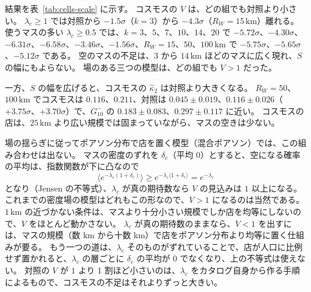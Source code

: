 \documentclass[a4paper,11pt]{ltjsarticle}
\begin{document}
結果を表~\ref{tab:cells-scale} に示す。
コスモスの $V$ は、どの組でも対照より小さい。
$\lambda_c \ge 1$ では対照から $-1.5\sigma$（$k = 3$）から $-4.3\sigma$（$R_W = 15\,\mathrm{km}$）離れる。
使うマスの多い $\lambda_c \ge 0.5$ では、$k = 3$、$5$、$7$、$10$、$14$、$20$ で $-5.72\sigma$、$-4.30\sigma$、$-6.31\sigma$、$-6.58\sigma$、$-3.46\sigma$、$-1.56\sigma$、$R_W = 15$、$50$、$100\,\mathrm{km}$ で $-5.75\sigma$、$-5.65\sigma$、$-5.12\sigma$ である。
空のマスの不足は、$3$ から $14\,\mathrm{km}$ ほどのマスに広く現れ、$S$ の幅にもよらない。
場のある三つの模型は、どの組でも $V > 1$ だった。

一方、$S$ の幅を広げると、コスモスの $\hat\kappa_2$ は対照より大きくなる。
$R_W = 50$、$100\,\mathrm{km}$ でコスモスは $0.116$、$0.211$、対照は $0.045 \pm 0.019$、$0.116 \pm 0.026$（$+3.75\sigma$、$+3.70\sigma$）で、$G_{10}^{-}$ の $0.183 \pm 0.083$、$0.297 \pm 0.117$ に近い。
コスモスの店は、$25\,\mathrm{km}$ より広い規模では固まっていながら、マスの空きは少ない。

場の揺らぎに従ってポアソン分布で店を置く模型（混合ポアソン）では、この組み合わせは出ない。
マスの密度のずれを $\delta_c$（平均 $0$）とすると、空になる確率の平均は、指数関数が下に凸なので
\begin{equation}
  \langle e^{-\lambda_c (1 + \delta_c)} \rangle \ge e^{-\lambda_c \langle 1 + \delta_c \rangle} = e^{-\lambda_c}
\end{equation}
となり（Jensen の不等式）、$\lambda_c$ が真の期待数なら $V$ の見込みは $1$ 以上になる。
これまでの密度場の模型はどれもこの形なので、$V > 1$ になるのは当然である。
$1\,\mathrm{km}$ の近づかない条件は、マスより十分小さい規模でしか店を均等にしないので、$V$ をほとんど動かさない。
$\lambda_c$ が真の期待数のままなら、$V < 1$ を出すには、マスの規模（数 km から十数 km）で店をポアソン分布より均等に置く仕組みが要る。
もう一つの道は、$\lambda_c$ そのものがずれていることで、店が人口に比例せず置かれると、$\lambda_c$ の層ごとに $\delta_c$ の平均が $0$ でなくなり、上の不等式は使えない。
対照の $V$ が $1$ より 1 割ほど小さいのは、$\lambda_c$ をカタログ自身から作る手順によるもので、コスモスの不足はそれよりずっと大きい。

\begin{table}[t]
  \centering
  \caption{マスの大きさ $k$（3 次メッシュ $k \times k$ 個）と、期待数を作る $S$ の幅 $R_W$ [km] を変えたときの空のマスの比 $V$（$\lambda_c \ge 1$ のマス）。
    「マス」はコスモスで使ったマスの数。
    模擬データは表~\ref{tab:cells} と同じ店の位置（各 20 個）で、平均 $\pm$ 標準偏差、括弧の中は（コスモス $-$ 平均）/ 標準偏差。}
  \label{tab:cells-scale}
  \scriptsize
  \setlength{\tabcolsep}{1.5pt}
  
\end{table}
\end{document}
